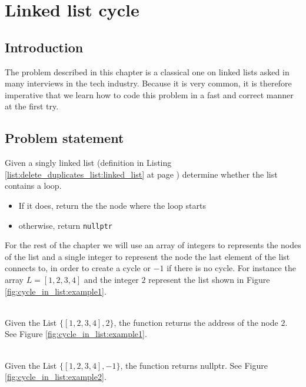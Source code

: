 %

\chapter{Linked list cycle}
\label{ch:cycle_in_list}
\section*{Introduction}
The problem described in this chapter is a classical one on linked lists asked in many interviews in the tech industry.
Because it is very common, it is therefore imperative that we learn how to code this problem in a fast and correct manner at the first try.

\section{Problem statement}
\begin{exercise}
Given a singly linked list (definition in Listing \ref{list:delete_duplicates_list:linked_list} at page \pageref{list:delete_duplicates_list:linked_list}) determine whether the list contains a loop.
\begin{itemize}
		\item If it does, return the the node where the loop starts
		\item otherwise, return \lstinline[columns=fixed]{nullptr}
\end{itemize}

For the rest of the chapter we will use an array of integers to represents the nodes of the list and a single integer to represent the node the last element of the list connects to, in order to create a cycle or $-1$ if there is no cycle. For instance  the array $L=[1,2,3,4]$ and the integer $2$ represent the list shown in Figure \ref{fig:cycle_in_list:example1}.

\begin{example}
	\hfill \\
	Given the List $\{[1,2,3,4],2\}$, the function returns the address of the node $2$. See Figure \ref{fig:cycle_in_list:example1}.
\end{example}

\begin{example}
	\hfill \\
	Given the List $\{[1,2,3,4],-1\}$, the function returns nullptr. See Figure \ref{fig:cycle_in_list:example2}.
\end{example}
\end{exercise}


